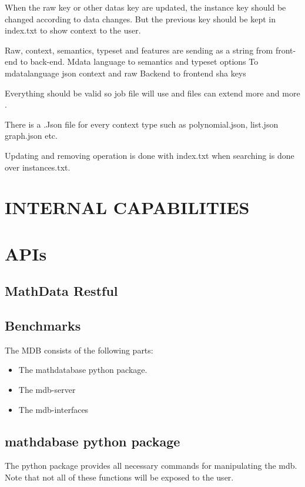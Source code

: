 \documentclass[12pt,twoside]{article}
\begin{document}
		
		\par When the raw key or other datas key are updated, the instance key should be changed according to data changes. But the previous key should be kept in index.txt to show context to the user.
		
		Raw, context, semantics, typeset and features are sending as a string from front-end to back-end.
		Mdata language to semantics and typeset options 
		To mdatalanguage json context and raw 
		Backend to frontend sha keys
		
		Everything should be valid so job file will use and files can extend more and more .

		
		There is a .Json file for every context type such as polynomial.json, list.json graph.json etc.
		
	
		Updating and removing operation is done with index.txt when searching is done over instances.txt.
		
	\section{INTERNAL CAPABILITIES}
	
	
	\newpage
	\section{APIs}
	
	\subsection{MathData Restful}
	
	\subsection{Benchmarks}
	\par The MDB consists of the following parts:
	\begin{itemize}
		\item The mathdatabase python package.
		\item The mdb-server
		\item The mdb-interfaces
	\end{itemize}
	
	\subsection*{mathdabase python package}
	\par The python package provides all necessary commands for manipulating the mdb. Note that not all of these functions will be exposed to the user.
	
\end{document}
